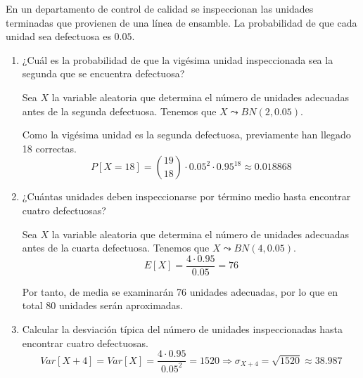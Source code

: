 \begin{ejercicio}
    En un departamento de control de calidad se inspeccionan las unidades terminadas que provienen de una línea de ensamble. La probabilidad de que cada unidad sea defectuosa es $0.05$.
    \begin{enumerate}
        \item  ¿Cuál es la probabilidad de que la vigésima unidad inspeccionada sea la segunda que se encuentra defectuosa?

        Sea $X$ la variable aleatoria que determina el número de unidades adecuadas antes de la segunda defectuosa. Tenemos que $X\leadsto BN(2, 0.05)$.

        Como la vigésima unidad es la segunda defectuosa, previamente han llegado 18 correctas.
        \begin{equation*}
            P[X=18]=\binom{19}{18}\cdot 0.05^2 \cdot 0.95^{18} \approx 0.018868
        \end{equation*}
        
        \item  ¿Cuántas unidades deben inspeccionarse por término medio hasta encontrar cuatro defectuosas?

        Sea $X$ la variable aleatoria que determina el número de unidades adecuadas antes de la cuarta defectuosa. Tenemos que $X\leadsto BN(4, 0.05)$.
        \begin{equation*}
            E[X]=\frac{4\cdot 0.95}{0.05}=76
        \end{equation*}

        Por tanto, de media se examinarán 76 unidades adecuadas, por lo que en total 80 unidades serán aproximadas.
        
        \item  Calcular la desviación típica del número de unidades inspeccionadas hasta encontrar cuatro defectuosas.
        \begin{equation*}
            Var[X+4]=Var[X]=\frac{4\cdot 0.95}{0.05^2}=1520 \Longrightarrow \sigma_{X+4}=\sqrt{1520}\approx 38.987
        \end{equation*}
    \end{enumerate}
\end{ejercicio}


